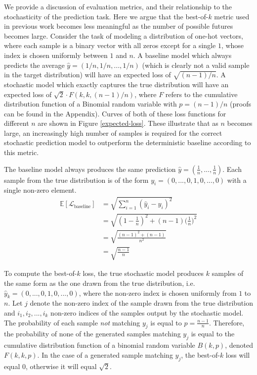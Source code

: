 \documentclass{article}
\begin{document}
We provide a discussion of evaluation metrics, and their relationship to the stochasticity of the prediction task.
Here we argue that the best-of-$k$ metric used in previous work \citep{Walker2016, Babaeizadeh2018, Denton2018} becomes less meaningful as the number of possible futures becomes large.
Consider the task of modeling a distribution of one-hot vectors, where each sample is a binary vector with all zeros except for a single $1$, whose index is chosen uniformly between $1$ and $n$.
A baseline model which always predicts the average $\hat{y} = (1/n, 1/n, ..., 1/n)$ (which is clearly not a valid sample in the target distribution) will have an expected loss of $\sqrt{(n-1)/n}$. A stochastic model which exactly captures the true distribution will have an expected loss of $\sqrt{2} \cdot F(k, k, (n-1)/n)$, where $F$ refers to the cumulative distribution function of a Binomial random variable with $p=(n-1)/n$ (proofs can be found in the Appendix).
Curves of both of these loss functions for different $n$ are shown in Figure \ref{expected-loss}.
These illustrate that as $n$ becomes large, an increasingly high number of samples is required for the correct stochastic prediction model to outperform the deterministic baseline according to this metric.


The baseline model always produces the same prediction $\hat{y} = (\frac{1}{n}, ..., \frac{1}{n})$. Each sample from the true distribution is of the form $y_i = (0, ..., 0, 1, 0, ..., 0)$ with a single non-zero element.
\begin{align}
  \mathbb{E}[\mathcal{L}_{\mbox{baseline}}] &= \sqrt{\sum_{i=1}^n (\hat{y}_i - y_i)^2} \\
  &= \sqrt{(1-\frac{1}{n})^2 + (n-1)\Big ( \frac{1}{n} \Big )^2} \\
  &= \sqrt{\frac{(n-1)^2 + (n-1)}{n^2}} \\
  &= \sqrt{\frac{n-1}{n}}
\end{align}

To compute the best-of-$k$ loss, the true stochastic model produces $k$ samples of the same form as the one drawn from the true distribution, i.e. $\hat{y}_k = (0, ..., 0, 1, 0, ..., 0)$, where the non-zero index is chosen uniformly from $1$ to $n$.
Let $j$ denote the non-zero index of the sample drawn from the true distribution and $i_1, i_2, ..., i_k$ non-zero indices of the samples output by the stochastic model.
The probability of each sample \textit{not} matching $y_j$ is equal to $p=\frac{n-1}{n}$.
Therefore, the probability of none of the generated samples matching $y_j$ is equal to the cumulative distribution function of a binomial random variable $B(k, p)$, denoted $F(k, k, p)$.
In the case of a generated sample matching $y_j$, the best-of-$k$ loss will equal 0, otherwise it will equal $\sqrt{2}$.
\end{document}
